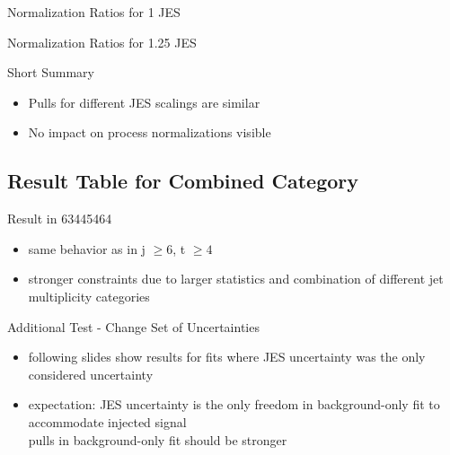 \begin{frame}{Normalization Ratios for \num[round-precision=2]{1} JES}
\begin{scriptsize}

\end{scriptsize}
\end{frame}

\begin{frame}{Normalization Ratios for \num[round-precision=2]{1.25} JES}
\begin{scriptsize}

\end{scriptsize}
\end{frame}

\begin{frame}{Short Summary}
\begin{itemize}
\item Pulls for different JES scalings are similar
\item No impact on process normalizations visible
\end{itemize}
\end{frame}

\subsection{Result Table for Combined Category}
\begin{frame}{Result in 63445464}

\begin{itemize}
\item same behavior as in j $\geq 6$, t $\geq 4$
\item stronger constraints due to larger statistics and combination of different jet multiplicity categories
\end{itemize}
\end{frame}

\begin{frame}{Additional Test - Change Set of Uncertainties}
\begin{itemize}
\item following slides show results for fits where JES uncertainty was the only considered uncertainty
\item expectation: JES uncertainty is the only freedom in background-only fit to accommodate injected signal\\
\rar pulls in background-only fit should be stronger
\end{itemize}
\end{frame}

